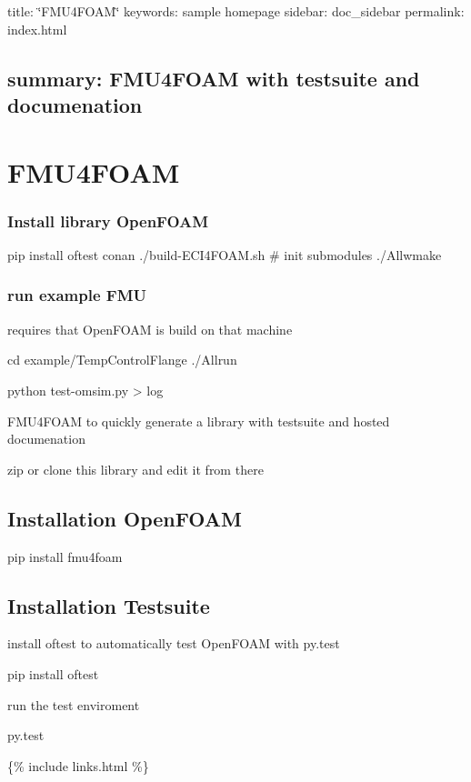 

 title\+: \char`\"{}\+F\+M\+U4\+F\+O\+A\+M\char`\"{} keywords\+: sample homepage sidebar\+: doc\+\_\+sidebar permalink\+: index.\+html \subsection*{summary\+: F\+M\+U4\+F\+O\+AM with testsuite and documenation }

\section*{F\+M\+U4\+F\+O\+AM}

\subsubsection*{Install library Open\+F\+O\+AM}


\begin{DoxyCode}
pip install oftest conan
./build-ECI4FOAM.sh # init submodules
./Allwmake
\end{DoxyCode}


\subsubsection*{run example F\+MU}

requires that Open\+F\+O\+AM is build on that machine


\begin{DoxyCode}
cd example/TempControlFlange
./Allrun
\end{DoxyCode}



\begin{DoxyCode}
python test-omsim.py > log
\end{DoxyCode}


F\+M\+U4\+F\+O\+AM to quickly generate a library with testsuite and hosted documenation

zip or clone this library and edit it from there

\subsection*{Installation Open\+F\+O\+AM}


\begin{DoxyCode}
pip install fmu4foam
\end{DoxyCode}


\subsection*{Installation Testsuite}

install oftest to automatically test Open\+F\+O\+AM with py.\+test


\begin{DoxyCode}
pip install oftest
\end{DoxyCode}


run the test enviroment 
\begin{DoxyCode}
py.test
\end{DoxyCode}


\{\% include links.\+html \%\} 